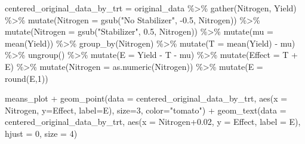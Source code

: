 \documentclass[
]{book}
\newenvironment{Shaded}{\begin{snugshade}}{\end{snugshade}}
\newcommand{\AttributeTok}[1]{\textcolor[rgb]{0.77,0.63,0.00}{#1}}
\newcommand{\DecValTok}[1]{\textcolor[rgb]{0.00,0.00,0.81}{#1}}
\newcommand{\FloatTok}[1]{\textcolor[rgb]{0.00,0.00,0.81}{#1}}
\newcommand{\FunctionTok}[1]{\textcolor[rgb]{0.00,0.00,0.00}{#1}}
\newcommand{\NormalTok}[1]{#1}
\newcommand{\OtherTok}[1]{\textcolor[rgb]{0.56,0.35,0.01}{#1}}
\newcommand{\SpecialCharTok}[1]{\textcolor[rgb]{0.00,0.00,0.00}{#1}}
\newcommand{\StringTok}[1]{\textcolor[rgb]{0.31,0.60,0.02}{#1}}
\begin{document}
\begin{Shaded}
\begin{Highlighting}[]
\NormalTok{centered\_original\_data\_by\_trt }\OtherTok{=}\NormalTok{ original\_data }\SpecialCharTok{\%\textgreater{}\%}
  \FunctionTok{gather}\NormalTok{(Nitrogen, Yield) }\SpecialCharTok{\%\textgreater{}\%}
  \FunctionTok{mutate}\NormalTok{(}\AttributeTok{Nitrogen =} \FunctionTok{gsub}\NormalTok{(}\StringTok{"No Stabilizer"}\NormalTok{, }\SpecialCharTok{{-}}\FloatTok{0.5}\NormalTok{, Nitrogen)) }\SpecialCharTok{\%\textgreater{}\%}
  \FunctionTok{mutate}\NormalTok{(}\AttributeTok{Nitrogen =} \FunctionTok{gsub}\NormalTok{(}\StringTok{"Stabilizer"}\NormalTok{, }\FloatTok{0.5}\NormalTok{, Nitrogen)) }\SpecialCharTok{\%\textgreater{}\%}
  \FunctionTok{mutate}\NormalTok{(}\AttributeTok{mu =} \FunctionTok{mean}\NormalTok{(Yield)) }\SpecialCharTok{\%\textgreater{}\%}
  \FunctionTok{group\_by}\NormalTok{(Nitrogen) }\SpecialCharTok{\%\textgreater{}\%}
  \FunctionTok{mutate}\NormalTok{(}\AttributeTok{T =} \FunctionTok{mean}\NormalTok{(Yield) }\SpecialCharTok{{-}}\NormalTok{ mu) }\SpecialCharTok{\%\textgreater{}\%}
  \FunctionTok{ungroup}\NormalTok{() }\SpecialCharTok{\%\textgreater{}\%}
  \FunctionTok{mutate}\NormalTok{(}\AttributeTok{E =}\NormalTok{ Yield }\SpecialCharTok{{-}}\NormalTok{ T }\SpecialCharTok{{-}}\NormalTok{ mu) }\SpecialCharTok{\%\textgreater{}\%}  
  \FunctionTok{mutate}\NormalTok{(}\AttributeTok{Effect =}\NormalTok{ T }\SpecialCharTok{+}\NormalTok{ E) }\SpecialCharTok{\%\textgreater{}\%}
  \FunctionTok{mutate}\NormalTok{(}\AttributeTok{Nitrogen =} \FunctionTok{as.numeric}\NormalTok{(Nitrogen)) }\SpecialCharTok{\%\textgreater{}\%}
  \FunctionTok{mutate}\NormalTok{(}\AttributeTok{E =} \FunctionTok{round}\NormalTok{(E,}\DecValTok{1}\NormalTok{))}

\NormalTok{means\_plot }\SpecialCharTok{+} \FunctionTok{geom\_point}\NormalTok{(}\AttributeTok{data =}\NormalTok{ centered\_original\_data\_by\_trt, }\FunctionTok{aes}\NormalTok{(}\AttributeTok{x =}\NormalTok{ Nitrogen, }\AttributeTok{y=}\NormalTok{Effect, }\AttributeTok{label=}\NormalTok{E), }\AttributeTok{size=}\DecValTok{3}\NormalTok{, }\AttributeTok{color=}\StringTok{"tomato"}\NormalTok{) }\SpecialCharTok{+} 
  \FunctionTok{geom\_text}\NormalTok{(}\AttributeTok{data =}\NormalTok{ centered\_original\_data\_by\_trt, }\FunctionTok{aes}\NormalTok{(}\AttributeTok{x =}\NormalTok{ Nitrogen}\FloatTok{+0.02}\NormalTok{, }\AttributeTok{y =}\NormalTok{ Effect, }\AttributeTok{label =}\NormalTok{ E), }\AttributeTok{hjust =} \DecValTok{0}\NormalTok{, }\AttributeTok{size =} \DecValTok{4}\NormalTok{)}
\end{Highlighting}
\end{Shaded}
\end{document}
